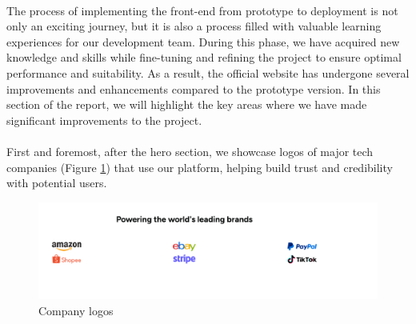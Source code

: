 \paragraph{} The process of implementing the front-end from prototype to deployment is not only an exciting journey, but it is also a process filled with valuable learning experiences for our development team. During this phase, we have acquired new knowledge and skills while fine-tuning and refining the project to ensure optimal performance and suitability. As a result, the official website has undergone several improvements and enhancements compared to the prototype version. In this section of the report, we will highlight the key areas where we have made significant improvements to the project.
\paragraph{}First and foremost, after the hero section, we showcase logos of major tech companies (Figure \ref{fig:logos}) that use our platform, helping build trust and credibility with potential users.
  \begin{figure}[h]
    \centering
    \includegraphics[width= 1\textwidth]{figures/deploy_change.png}
     \caption{Company logos}
    \label{fig:logos}
\end{figure}
